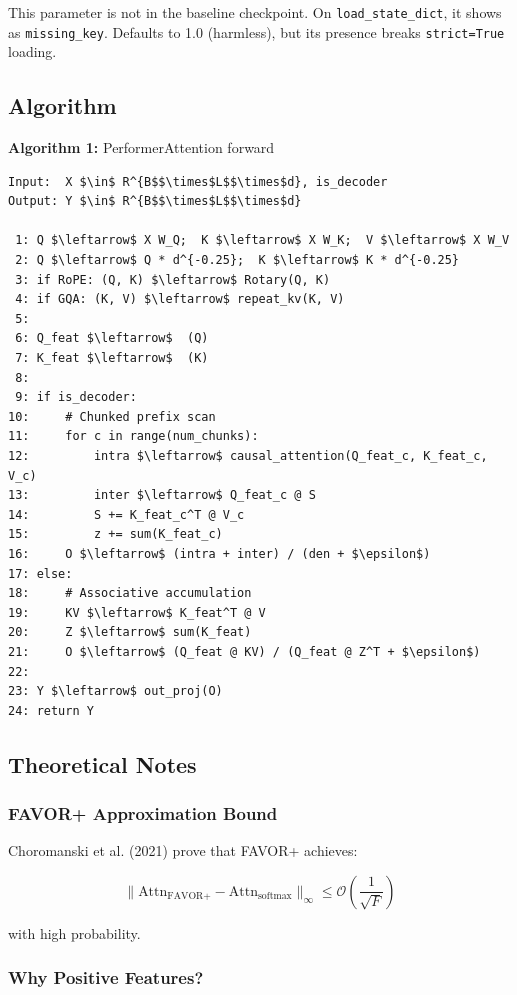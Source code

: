 This parameter is not in the baseline checkpoint. On \texttt{load\_state\_dict}, it 
shows as \texttt{missing\_key}. Defaults to 1.0 (harmless), but its presence breaks 
\texttt{strict=True} loading.

\subsection{Algorithm}

\textbf{Algorithm 1:} PerformerAttention forward
\begin{lstlisting}
Input:  X $\in$ R^{B$$\times$L$$\times$d}, is_decoder
Output: Y $\in$ R^{B$$\times$L$$\times$d}

 1: Q $\leftarrow$ X W_Q;  K $\leftarrow$ X W_K;  V $\leftarrow$ X W_V
 2: Q $\leftarrow$ Q * d^{-0.25};  K $\leftarrow$ K * d^{-0.25}
 3: if RoPE: (Q, K) $\leftarrow$ Rotary(Q, K)
 4: if GQA: (K, V) $\leftarrow$ repeat_kv(K, V)
 5:
 6: Q_feat $\leftarrow$  (Q)
 7: K_feat $\leftarrow$  (K)
 8:
 9: if is_decoder:
10:     # Chunked prefix scan
11:     for c in range(num_chunks):
12:         intra $\leftarrow$ causal_attention(Q_feat_c, K_feat_c, V_c)
13:         inter $\leftarrow$ Q_feat_c @ S
14:         S += K_feat_c^T @ V_c
15:         z += sum(K_feat_c)
16:     O $\leftarrow$ (intra + inter) / (den + $\epsilon$)
17: else:
18:     # Associative accumulation
19:     KV $\leftarrow$ K_feat^T @ V
20:     Z $\leftarrow$ sum(K_feat)
21:     O $\leftarrow$ (Q_feat @ KV) / (Q_feat @ Z^T + $\epsilon$)
22:
23: Y $\leftarrow$ out_proj(O)
24: return Y
\end{lstlisting}

\subsection{Theoretical Notes}

\subsubsection{FAVOR+ Approximation Bound}

Choromanski et al. (2021) prove that FAVOR+ achieves:

\[
\|\text{Attn}_{\text{FAVOR+}} - \text{Attn}_{\text{softmax}}\|_\infty \leq \mathcal{O}\!\left(\frac{1}{\sqrt{F}}\right)
\tag{4.7}
\]

with high probability.

\subsubsection{Why Positive Features?}

